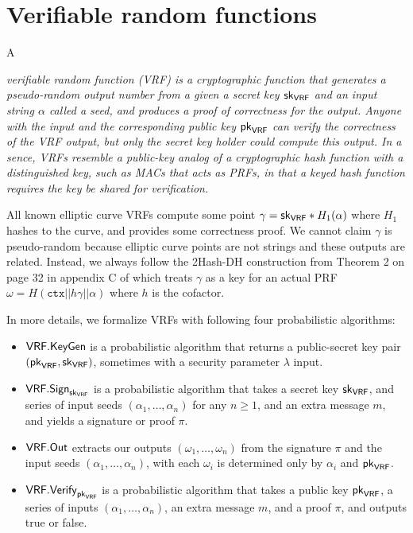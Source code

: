 \section{Verifiable random functions}
\label{sec:VRFs}


A {\em verifiable random function (VRF) is a cryptographic function that generates a pseudo-random output number from a given a secret key $\mathsf{sk}_{\mathsf{VRF}}$ and an input string $\alpha$ called a seed, and produces a proof of correctness for the output.  Anyone with the input and the corresponding public key $\mathsf{pk}_{\mathsf{VRF}}$ can verify the correctness of the VRF output, but only the secret key holder could compute this output.  In a sence, VRFs resemble a public-key analog of a cryptographic hash function with a distinguished key, such as MACs that acts as PRFs, in that a keyed hash function requires the key be shared for verification. 

All known elliptic curve VRFs compute some point $\gamma = \mathsf{sk}_{\mathsf{VRF}} * H_1(\alpha)$ where $H_1$ hashes to the curve, and provides some correctness proof.  We cannot claim $\gamma$ is pseudo-random because elliptic curve points are not strings and these outputs are related.  Instead, we always follow the 2Hash-DH construction from Theorem 2 on page 32 in appendix C of \cite{Praos} which treats $\gamma$ as a key for an actual PRF $\omega = H(\mathtt{ctx} || h \gamma || \alpha)$ where $h$ is the cofactor.  

In more details, we formalize VRFs with following four probabilistic algorithms: 
\begin{itemize}
\item $\mathsf{VRF}.\mathsf{KeyGen}$ is a probabilistic algorithm that returns a public-secret key pair $(\mathsf{pk}_{\mathsf{VRF}},\mathsf{sk}_{\mathsf{VRF}})$, sometimes with a security parameter $\lambda$ input.
\item $\mathsf{VRF}.\mathsf{Sign}_{\mathsf{sk}_{\mathsf{VRF}}}$ is a probabilistic algorithm that takes a secret key $\mathsf{sk}_{\mathsf{VRF}}$, and series of input seeds $(\alpha_1,\ldots,\alpha_n)$ for any $n\ge1$, and an extra message $m$, and yields a signature or proof $\pi$. 
\item $\mathsf{VRF}.\mathsf{Out}$ extracts our outputs $(\omega_1,\ldots,\omega_n)$ from the signature $\pi$ and the input seeds $(\alpha_1,\ldots,\alpha_n)$, with each $\omega_i$ is determined only by $\alpha_i$ and $\mathsf{pk}_{\mathsf{VRF}}$.
\item $\mathsf{VRF}.\mathsf{Verify}_{\mathsf{pk}_{\mathsf{VRF}}}$ is a probabilistic algorithm that takes a public key $\mathsf{pk}_{\mathsf{VRF}}$, a series of inputs $(\alpha_1,\ldots,\alpha_n)$, an extra message $m$, and a proof $\pi$, and outputs true or false.
\end{itemize}

}
